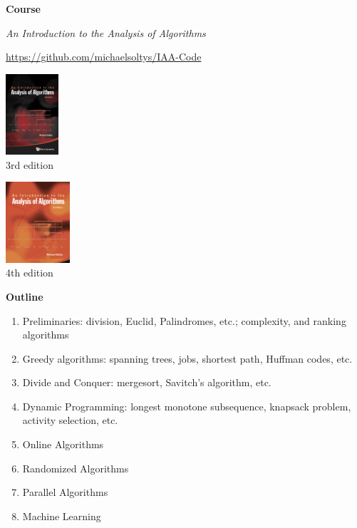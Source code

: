 
\newcommand{\mytitle}{Welcome}
\newcommand{\mychpnr}{0}


\begin{frame}
{\bf Course}

{\em An Introduction to the Analysis of Algorithms}

\url{https://github.com/michaelsoltys/IAA-Code}

\begin{minipage}{0.4\textwidth}
\raggedright
\includegraphics[height=3cm]{Figures/IAA-ed3.jpg}\\
3rd edition
\end{minipage}
\begin{minipage}{0.4\textwidth}
\raggedright
\includegraphics[height=3cm]{Figures/IAA-ed4.png}\\
4th edition
\end{minipage}


\end{frame}

\begin{frame}
{\bf Outline}

\begin{enumerate}
\item  Preliminaries: division, Euclid, Palindromes, etc.; complexity,
and ranking algorithms
\item  Greedy algorithms: spanning trees, jobs, shortest path, Huffman
codes, etc.
\item  Divide and Conquer: mergesort, Savitch's algorithm, etc.
\item  Dynamic Programming: longest monotone subsequence, knapsack
problem, activity selection, etc. \\
\hrulefill
\item  Online Algorithms
\item  Randomized Algorithms
\item  Parallel Algorithms
\item  Machine Learning
\end{enumerate}
\end{frame}

